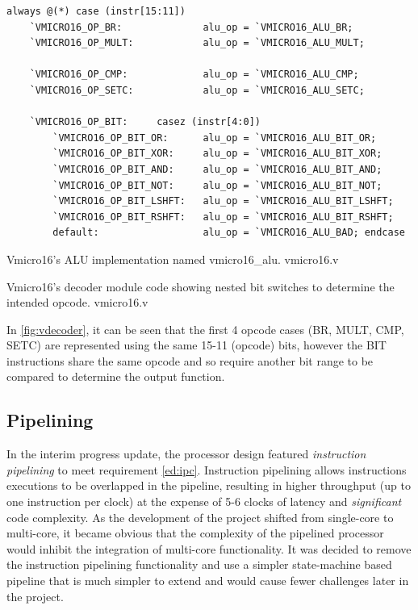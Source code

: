 \begin{listing}[H]
\centering
\begin{verbatim}
always @(*) case (instr[15:11])
    `VMICRO16_OP_BR:              alu_op = `VMICRO16_ALU_BR;
    `VMICRO16_OP_MULT:            alu_op = `VMICRO16_ALU_MULT;

    `VMICRO16_OP_CMP:             alu_op = `VMICRO16_ALU_CMP;
    `VMICRO16_OP_SETC:            alu_op = `VMICRO16_ALU_SETC;
    
    `VMICRO16_OP_BIT:     casez (instr[4:0])
        `VMICRO16_OP_BIT_OR:      alu_op = `VMICRO16_ALU_BIT_OR;
        `VMICRO16_OP_BIT_XOR:     alu_op = `VMICRO16_ALU_BIT_XOR;
        `VMICRO16_OP_BIT_AND:     alu_op = `VMICRO16_ALU_BIT_AND;
        `VMICRO16_OP_BIT_NOT:     alu_op = `VMICRO16_ALU_BIT_NOT;
        `VMICRO16_OP_BIT_LSHFT:   alu_op = `VMICRO16_ALU_BIT_LSHFT;
        `VMICRO16_OP_BIT_RSHFT:   alu_op = `VMICRO16_ALU_BIT_RSHFT;
        default:                  alu_op = `VMICRO16_ALU_BAD; endcase
\end{verbatim}
\caption{Vmicro16's ALU implementation named vmicro16\_alu. vmicro16.v}
\caption{Vmicro16's decoder module code showing nested bit switches to determine the intended opcode. vmicro16.v}
\label{fig:vdecoder}
\end{listing}

In \cref{fig:vdecoder}, it can be seen that the first 4 opcode cases (BR, MULT, CMP, SETC) are represented using the same 15-11 (opcode) bits, however the BIT instructions share the same opcode and so require another bit range to be compared to determine the output function.



\subsection{Pipelining}
In the interim progress update, the processor design featured \textit{instruction pipelining} to meet requirement \ref{ed:ipc}. Instruction pipelining allows instructions executions to be overlapped in the pipeline, resulting in higher throughput (up to one instruction per clock) at the expense of 5-6 clocks of latency and \textit{significant} code complexity. As the development of the project shifted from single-core to multi-core, it became obvious that the complexity of the pipelined processor would inhibit the integration of multi-core functionality. It was decided to remove the instruction pipelining functionality and use a simpler state-machine based pipeline that is much simpler to extend and would cause fewer challenges later in the project. 


